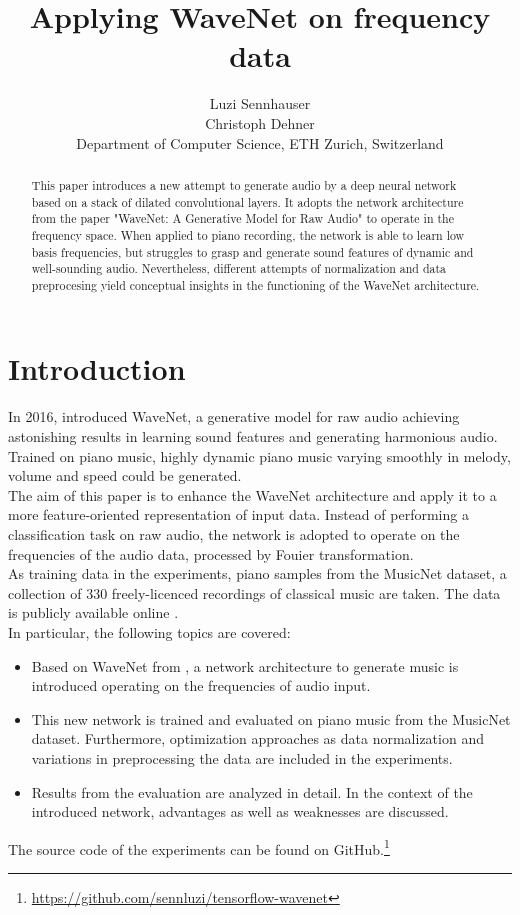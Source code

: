 \documentclass[10pt,conference,compsocconf]{IEEEtran}
\begin{document}
\title{Applying WaveNet on frequency data}

\author{
  Luzi Sennhauser\\
  Christoph Dehner\\
  Department of Computer Science, ETH Zurich, Switzerland
}

\maketitle

\begin{abstract}
	This paper introduces a new attempt to generate audio by a deep neural network based on a stack of dilated convolutional layers. It adopts the network architecture from the paper "WaveNet: A Generative Model for Raw Audio" to operate in the frequency space. When applied to piano recording, the network is able to learn low basis frequencies, but struggles to grasp and generate sound features of dynamic and well-sounding audio. Nevertheless, different attempts of normalization and data preprocesing yield conceptual insights in the functioning of the WaveNet architecture.
\end{abstract}

\section{Introduction}
In 2016, \cite{wavenet} introduced WaveNet, a generative model for raw audio achieving astonishing results in learning sound features and generating harmonious audio. Trained on piano music, highly dynamic piano music varying smoothly in melody, volume and speed could be generated.\\
The aim of this paper is to enhance the WaveNet architecture and apply it to a more feature-oriented representation of input data. Instead of performing a classification task on raw audio, the network is adopted to operate on the frequencies of the audio data, processed by Fouier transformation.\\
As training data in the experiments, piano samples from the MusicNet dataset, a collection of 330 freely-licenced recordings of classical music are taken. The data is publicly available online \cite{musicnet}.\\
In particular, the following topics are covered:
\begin{itemize}
\item Based on WaveNet from \cite{wavenet}, a network architecture to generate music is introduced operating on the frequencies of audio input.
\item This new network is trained and evaluated on piano music from the MusicNet dataset. Furthermore, optimization approaches as data normalization and variations in preprocessing the data are included in the experiments.
\item Results from the evaluation are analyzed in detail. In the context of the introduced network, advantages as well as weaknesses are discussed. 
\end{itemize}
The source code of the experiments can be found on GitHub.\footnote{\url{https://github.com/sennluzi/tensorflow-wavenet}}
\end{document}
